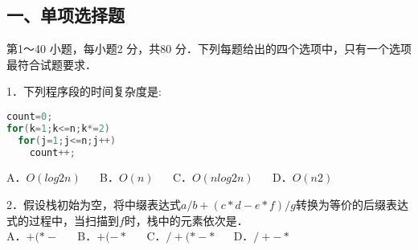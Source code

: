
\subsection{一、单项选择题}
第1～40 小题，每小题2 分，共80 分．下列每题给出的四个选项中，只有一个选项最符合试题要求．

1．下列程序段的时间复杂度是:
\begin{lstlisting}[language=cpp]
count=0;
for(k=1;k<=n;k*=2)
  for(j=1;j<=n;j++)
    count++;
\end{lstlisting}
A．$O(log2n)$ $\quad$ B．$O(n)$ $\quad$ C．$O(nlog2n)$ $\quad$ D．$O(n2)$

2．假设栈初始为空，将中缀表达式$a/b+(c*d-e*f)/g$转换为等价的后缀表达式的过程中，当扫描到$f$时，栈中的元素依次是． \\
A．$+ ( * -$  $\quad$ B．$+ ( - *$  $\quad$ C．$/ + ( * - *$  $\quad$ D．$/ + - *$

